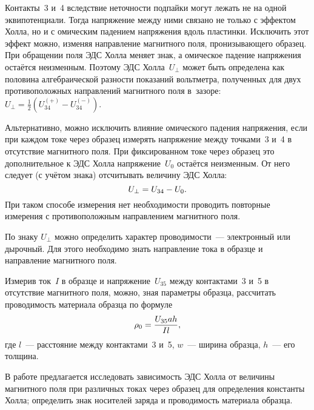 Контакты~3 и~4 вследствие неточности подпайки могут лежать не на одной
эквипотенциали. Тогда напряжение между ними связано не только с эффектом
Холла, но и с омическим падением напряжения вдоль пластинки. 
Исключить этот эффект можно, изменяя направление магнитного поля, 
пронизывающего образец. 
При обращении поля ЭДС Холла меняет знак, а омическое падение напряжения
остаётся неизменным. Поэтому ЭДС Холла~$U_{\perp}$ может быть определена
как половина алгебраической разности показаний вольтметра, полученных для двух
противоположных направлений магнитного поля в~зазоре:
$U_{\perp} = \frac12 (U_{34}^{(+)}-U_{34}^{(-)})$.

Альтернативно, можно исключить влияние омического падения напряжения, 
если при каждом токе через образец измерять напряжение
между точками~3 и~4 в отсутствие магнитного поля. При фиксированном токе через
образец это дополнительное к ЭДС Холла напряжение~$U_0$ остаётся неизменным. 
От него следует (с учётом знака) отсчитывать величину ЭДС Холла:
\begin{equation}
	U_{\perp} = U_{34} - U_0.
	\eqmark{3.4.1}
\end{equation}
При таком способе измерения нет необходимости проводить повторные измерения
с противоположным направлением магнитного поля.

По знаку $U_{\perp}$ можно определить характер проводимости~--- 
электронный или дырочный. Для этого необходимо знать направление тока 
в образце и направление магнитного поля.

Измерив ток~$I$ в образце и напряжение~$U_{35}$ между контактами~3 и~5 в
отсутствие магнитного поля, можно, зная
параметры образца, рассчитать проводимость материала образца по формуле
\begin{equation}
	\rho_0=\frac{U_{35}ah}{Il},
	\eqmark{3.4.2}
\end{equation}
где $l$~--- расстояние между контактами~3 и~5, $w$~--- ширина образца, $h$~---
его толщина.

\labtask

В работе предлагается исследовать зависимость ЭДС Холла от величины магнитного
поля при различных токах через образец для определения константы Холла;
определить знак носителей заряда и проводимость материала образца.

